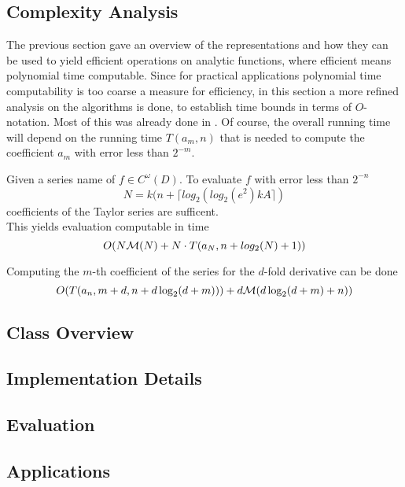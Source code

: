 	\subsection{Complexity Analysis}
		The previous section gave an overview of the representations and how they can be used to yield efficient 
		operations on analytic functions, where efficient means polynomial time computable.
		Since for practical applications polynomial time computability is too coarse a measure for efficiency, 
		in this section a more refined analysis on the algorithms is done, to establish time bounds in terms of $O$-notation.
		Most of this was already done in \cite{mypaper}.
		Of course, the overall running time will depend on the running time $T(a_m, n)$ that is needed to 
		compute the coefficient $a_m$ with error less than $2^{-m}$.
		\begin{theorem}
			Given a series name of $f \in C^\omega(D)$.
			To evaluate $f$ with error less than $2^{-n}$ 
			$$N = k(n+\lceil log_2(log_2 (e^2) kA \rceil)$$
			coefficients of the Taylor series are sufficent. \\
			This yields evaluation computable in time 
			$$ O(N\mathcal M(N)+N \cdot T(a_N, n+log_2(N)+1)) $$ 
		\end{theorem}

		\begin{theorem}
			Computing the $m$-th coefficient of the series for the $d$-fold derivative can be done
			$$ O(T(a_n, m+d, n+d\log_2(d+m)))+d\mathcal M(d \log_2 (d+m)+n)) $$
		\end{theorem}
	\subsection{Class Overview}
	\subsection{Implementation Details}
	\subsection{Evaluation}
	\subsection{Applications}